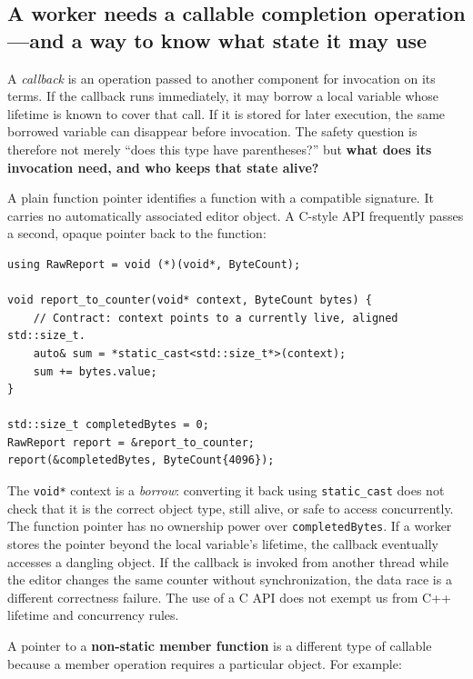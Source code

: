\subsection{A worker needs a callable completion operation---and a way to know what state it may use}\label{01-foundations-i-ch004-a-worker-needs-a-callable-completion-operationand-a-way-to-know-what-state-it-may-use}

A \emph{callback} is an operation passed to another component for invocation on its terms. If the callback runs immediately, it may borrow a local variable whose lifetime is known to cover that call. If it is stored for later execution, the same borrowed variable can disappear before invocation. The safety question is therefore not merely ``does this type have parentheses?'' but \textbf{what does its invocation need, and who keeps that state alive?}

A plain function pointer identifies a function with a compatible signature. It carries no automatically associated editor object. A C-style API frequently passes a second, opaque pointer back to the function:

\begin{verbatim}
using RawReport = void (*)(void*, ByteCount);

void report_to_counter(void* context, ByteCount bytes) {
    // Contract: context points to a currently live, aligned std::size_t.
    auto& sum = *static_cast<std::size_t*>(context);
    sum += bytes.value;
}

std::size_t completedBytes = 0;
RawReport report = &report_to_counter;
report(&completedBytes, ByteCount{4096});
\end{verbatim}

The \texttt{void*} context is a \emph{borrow}: converting it back using \texttt{static\_cast} does not check that it is the correct object type, still alive, or safe to access concurrently. The function pointer has no ownership power over \texttt{completedBytes}. If a worker stores the pointer beyond the local variable's lifetime, the callback eventually accesses a dangling object. If the callback is invoked from another thread while the editor changes the same counter without synchronization, the data race is a different correctness failure. The use of a C API does not exempt us from C++ lifetime and concurrency rules.

A pointer to a \textbf{non-static member function} is a different type of callable because a member operation requires a particular object. For example:

